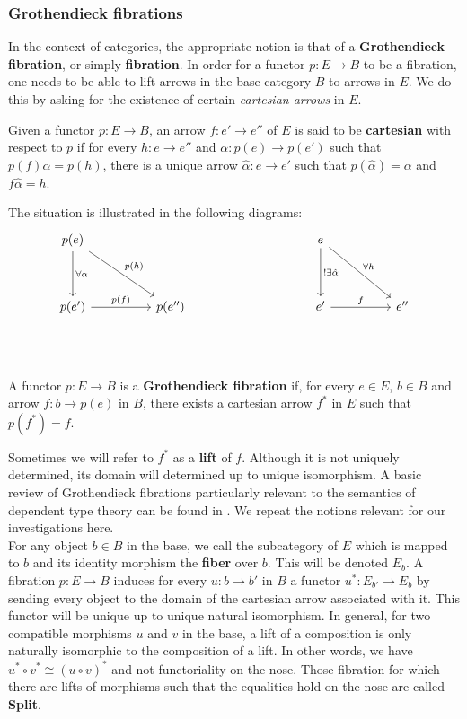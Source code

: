 \subsubsection{Grothendieck fibrations}
In the context of categories, the appropriate notion is that of a \textbf{Grothendieck fibration}, or simply \textbf{fibration}. In order for a functor $p : E \to B$ to be a fibration, one needs to be able to lift arrows in the base category $B$ to arrows in $E$. We do this by asking for the existence of certain \textit{cartesian arrows} in $E$.
\begin{defn}
Given a functor $p : E \to B$, an arrow $f : e' \to e''$ of $E$ is said to be \textbf{cartesian} with respect to $p$ if for every $h : e \to e''$ and $\alpha : p(e) \to p(e')$ such that $p(f)\alpha = p(h)$, there is a unique arrow $\hat \alpha : e \to e'$ such that $p(\hat \alpha) = \alpha$ and $f \hat \alpha = h$.
\end{defn}
The situation is illustrated in the following diagrams:
\[
\ti
p(e) \ar[d, "\forall \alpha"] \ar[dr, "p(h)"] & & & e \ar[d, "!\exists \hat \alpha"] \ar[dr, "\forall h"] \\
p(e') \ar[r, "p(f)"] & p(e'') & & e' \ar[r, "f"] & e''\\
\kz
\]
\begin{defn}
A functor $p: E \to B$ is a \textbf{Grothendieck fibration} if, for every $e \in E$, $b \in B$ and arrow $f : b \to p(e)$ in $B$, there exists a cartesian arrow $f^*$ in $E$ such that $p(f^*) = f$.
\end{defn}
Sometimes we will refer to $f^*$ as a \textbf{lift} of $f$. Although it is not uniquely determined, its domain will determined up to unique isomorphism. 
A basic review of Grothendieck fibrations particularly relevant to the semantics of dependent type theory can be found in \cite{jacobs}. We repeat the notions relevant for our investigations here.
\\

For any object $b \in B$ in the base, we call the subcategory of $E$ which is mapped to $b$ and its identity morphism the \textbf{fiber} over $b$. This will be denoted $E_b$.
A fibration $p : E \to B$ induces for every $u : b \to b'$ in $B$ a functor $u^*: E_{b'} \to E_{b}$ by sending every object to the domain of the cartesian arrow associated with it. This functor will be unique up to unique natural isomorphism. In general, for two compatible morphisms $u$ and $v$ in the base, a lift of a composition is only naturally isomorphic to the composition of a lift. In other words, we have $u^* \circ v^* \cong (u \circ v)^*$ and not functoriality on the nose. Those fibration for which there are lifts of morphisms such that the equalities hold on the nose are called \textbf{Split}.

